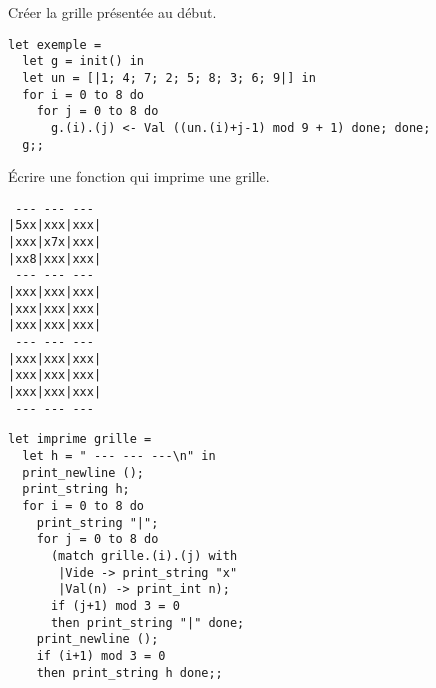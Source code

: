 \begin{Exercise}Créer la grille présentée au début.
\end{Exercise}
\begin{Answer}
\begin{lstlisting}
let exemple =
  let g = init() in
  let un = [|1; 4; 7; 2; 5; 8; 3; 6; 9|] in
  for i = 0 to 8 do
    for j = 0 to 8 do
      g.(i).(j) <- Val ((un.(i)+j-1) mod 9 + 1) done; done;
  g;;
\end{lstlisting} 
\end{Answer}
\begin{Exercise}\'Ecrire une fonction  qui imprime une grille.
\end{Exercise}
\begin{center}
\begin{lstlisting}
 --- --- ---
|5xx|xxx|xxx|
|xxx|x7x|xxx|
|xx8|xxx|xxx|
 --- --- ---
|xxx|xxx|xxx|
|xxx|xxx|xxx|
|xxx|xxx|xxx|
 --- --- ---
|xxx|xxx|xxx|
|xxx|xxx|xxx|
|xxx|xxx|xxx|
 --- --- ---
\end{lstlisting} 
\end{center}
\begin{Answer}
\begin{lstlisting}
let imprime grille =
  let h = " --- --- ---\n" in
  print_newline ();
  print_string h;
  for i = 0 to 8 do    
    print_string "|";
    for j = 0 to 8 do
      (match grille.(i).(j) with
       |Vide -> print_string "x"
       |Val(n) -> print_int n);
      if (j+1) mod 3 = 0
      then print_string "|" done;
    print_newline ();
    if (i+1) mod 3 = 0
    then print_string h done;;
\end{lstlisting} 
\end{Answer}
